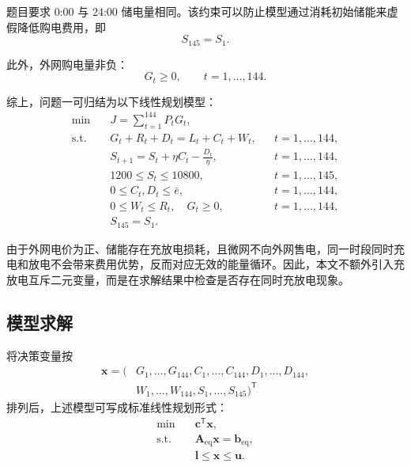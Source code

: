 题目要求 0:00 与 24:00 储电量相同。该约束可以防止模型通过消耗初始储能来虚假降低购电费用，即
\begin{equation}
  S_{145}=S_1.
  \label{eq:q1-cycle}
\end{equation}

此外，外网购电量非负：
\begin{equation}
  G_t\ge0,\qquad t=1,\ldots,144.
  \label{eq:q1-grid-bounds}
\end{equation}

综上，问题一可归结为以下线性规划模型：
\begin{equation}
\begin{aligned}
  \min\quad & J=\sum_{t=1}^{144}P_tG_t,\\
  \mathrm{s.t.}\quad
  & G_t+R_t+D_t=L_t+C_t+W_t, && t=1,\ldots,144,\\
  & S_{t+1}=S_t+\eta C_t-\frac{D_t}{\eta}, && t=1,\ldots,144,\\
  & 1200\le S_t\le10800, && t=1,\ldots,145,\\
  & 0\le C_t,D_t\le\bar e, && t=1,\ldots,144,\\
  & 0\le W_t\le R_t,\quad G_t\ge0, && t=1,\ldots,144,\\
  & S_{145}=S_1.
\end{aligned}
\label{eq:q1-lp}
\end{equation}

由于外网电价为正、储能存在充放电损耗，且微网不向外网售电，同一时段同时充电和放电不会带来费用优势，反而对应无效的能量循环。因此，本文不额外引入充放电互斥二元变量，而是在求解结果中检查是否存在同时充放电现象。

\subsection{模型求解}

将决策变量按
\begin{equation}
\begin{aligned}
  \mathbf{x}=\bigl(&G_1,\ldots,G_{144},C_1,\ldots,C_{144},D_1,\ldots,D_{144},\\
  &W_1,\ldots,W_{144},S_1,\ldots,S_{145}\bigr)^{\mathsf T}
\end{aligned}
\label{eq:q1-variable-vector}
\end{equation}
排列后，上述模型可写成标准线性规划形式：
\begin{equation}
\begin{aligned}
  \min\quad & \mathbf{c}^{\mathsf T}\mathbf{x},\\
  \mathrm{s.t.}\quad
  & \mathbf{A}_{\mathrm{eq}}\mathbf{x}=\mathbf{b}_{\mathrm{eq}},\\
  & \mathbf{l}\le\mathbf{x}\le\mathbf{u}.
\end{aligned}
\label{eq:q1-standard-lp}
\end{equation}

